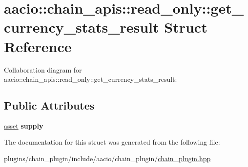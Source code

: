 \hypertarget{structaacio_1_1chain__apis_1_1read__only_1_1get__currency__stats__result}{}\section{aacio\+:\+:chain\+\_\+apis\+:\+:read\+\_\+only\+:\+:get\+\_\+currency\+\_\+stats\+\_\+result Struct Reference}
\label{structaacio_1_1chain__apis_1_1read__only_1_1get__currency__stats__result}


Collaboration diagram for aacio\+:\+:chain\+\_\+apis\+:\+:read\+\_\+only\+:\+:get\+\_\+currency\+\_\+stats\+\_\+result\+:
\subsection*{Public Attributes}
\begin{DoxyCompactItemize}
\item 
\mbox{\label{structaacio_1_1chain__apis_1_1read__only_1_1get__currency__stats__result_a861a618c91ec1ec11c7d002677049971}} 
\mbox{\hyperlink{structaacio_1_1asset}{asset}} {\bfseries supply}
\end{DoxyCompactItemize}


The documentation for this struct was generated from the following file\+:\begin{DoxyCompactItemize}
\item 
plugins/chain\+\_\+plugin/include/aacio/chain\+\_\+plugin/\mbox{\hyperlink{chain__plugin_8hpp}{chain\+\_\+plugin.\+hpp}}\end{DoxyCompactItemize}
